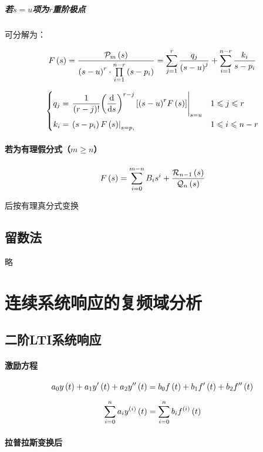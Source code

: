 \documentclass{article}
\begin{document}
\subparagraph{若$s=u$项为$r$重阶极点}

可分解为：

\[F\left(s\right)=\frac{\mathcal P_m\left(s\right)}{{\left(s-u\right)}^r\cdot\prod\limits_{i=1}^{n-r}\left(s-p_i\right)}
    =\sum_{j=1}^r\frac{q_j}{{\left(s-u\right)}^j}+\sum_{i=1}^{n-r}\frac{k_i}{s-p_i}\]

\[\left\{\begin{aligned}
        q_j & =\left.\frac1{\left(r-j\right)!}{\left(\frac{\mathrm d}{\mathrm d s}\right)}^{r-j}\left[{\left(s-u\right)}^rF\left(s\right)\right]\right|_{s=u} &  & 1\leqslant j\leqslant r   \\
        k_i & =\left.\left(s-p_i\right)F\left(s\right)\right|_{s=p_i}                                                       &  & 1\leqslant i\leqslant n-r
    \end{aligned}\right.\]

\paragraph{若为有理假分式（$m\geqslant n$）}

\[F\left(s\right)=\sum_{i=0}^{m-n}B_is^i+\frac{\mathcal R_{n-1}\left(s\right)}{\mathcal Q_n\left(s\right)}\]

后按有理真分式变换

\subsection{留数法}

略

\section{连续系统响应的复频域分析}

\subsection{二阶LTI系统响应}

\paragraph{激励方程}

\[a_0y\left(t\right)+a_1y^\prime\left(t\right)+a_2y^{\prime\prime}\left(t\right)
    =b_0f\left(t\right)+b_1f^\prime\left(t\right)+b_2f^{\prime\prime}\left(t\right)\]

\[\sum_{i=0}^na_iy^{\left(i\right)}\left(t\right)
    =\sum_{i=0}^nb_if^{\left(i\right)}\left(t\right)\]

\paragraph{拉普拉斯变换后}
\end{document}
